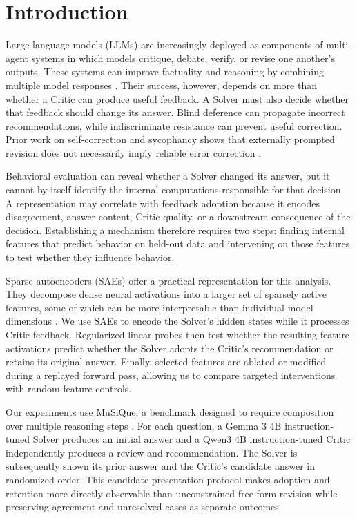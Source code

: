 \section{Introduction}
\label{sec:introduction}

Large language models (LLMs) are increasingly deployed as components of
multi-agent systems in which models critique, debate, verify, or revise one
another's outputs. These systems can improve factuality and reasoning by
combining multiple model responses \cite{du2024debate}. Their success,
however, depends on more than whether a Critic can produce useful feedback. A
Solver must also decide whether that feedback should change its answer. Blind
deference can propagate incorrect recommendations, while indiscriminate
resistance can prevent useful correction. Prior work on self-correction and
sycophancy shows that externally prompted revision does not necessarily imply
reliable error correction \cite{huang2024selfcorrect,sharma2024sycophancy}.

Behavioral evaluation can reveal whether a Solver changed its answer, but it
cannot by itself identify the internal computations responsible for that
decision. A representation may correlate with feedback adoption because it
encodes disagreement, answer content, Critic quality, or a downstream
consequence of the decision. Establishing a mechanism therefore requires two
steps: finding internal features that predict behavior on held-out data and
intervening on those features to test whether they influence behavior.

Sparse autoencoders (SAEs) offer a practical representation for this analysis.
They decompose dense neural activations into a larger set of sparsely active
features, some of which can be more interpretable than individual model
dimensions \cite{cunningham2023sparse,gao2025scaling}. We use SAEs to encode
the Solver's hidden states while it processes Critic feedback. Regularized
linear probes then test whether the resulting feature activations predict
whether the Solver adopts the Critic's recommendation or retains its original
answer. Finally, selected features are ablated or modified during a replayed
forward pass, allowing us to compare targeted interventions with random-feature
controls.

Our experiments use MuSiQue, a benchmark designed to require composition over
multiple reasoning steps \cite{trivedi2022musique}. For each question, a
Gemma 3 4B instruction-tuned Solver produces an initial answer and a Qwen3 4B
instruction-tuned Critic independently produces a review and recommendation.
The Solver is subsequently shown its prior answer and the Critic's candidate
answer in randomized order. This candidate-presentation protocol makes
adoption and retention more directly observable than unconstrained free-form
revision while preserving agreement and unresolved cases as separate outcomes.

